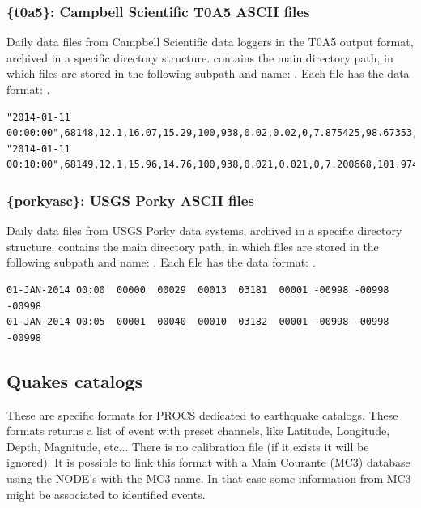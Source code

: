 \subsubsection{\{t0a5\}: Campbell Scientific T0A5 ASCII files}

Daily data files from Campbell Scientific data loggers in the T0A5 output format, archived in a specific directory structure.  contains the main directory path, in which files are stored in the following subpath and name: . Each file has the data format: .

\begin{lstlisting}[language={},title=Campbell T0A5 format example]
"2014-01-11 00:00:00",68148,12.1,16.07,15.29,100,938,0.02,0.02,0,7.875425,98.67353,10.86884,0,0,0,0,0,0,0,0
"2014-01-11 00:10:00",68149,12.1,15.96,14.76,100,938,0.021,0.021,0,7.200668,101.9742,11.35311,0,0,0,0,0,0,0,0
\end{lstlisting}


\subsubsection{\{porkyasc\}: USGS Porky ASCII files}

Daily data files from USGS Porky data systems, archived in a specific directory structure.  contains the main directory path, in which files are stored in the following subpath and name: . Each file has the data format: .

\begin{lstlisting}[language={},title=USGS Porky format example]
01-JAN-2014 00:00  00000  00029  00013  03181  00001 -00998 -00998 -00998
01-JAN-2014 00:05  00001  00040  00010  03182  00001 -00998 -00998 -00998
\end{lstlisting}

\subsection{Quakes catalogs}

These are specific formats for PROCS dedicated to earthquake catalogs. These formats returns a list of event with preset channels, like Latitude, Longitude, Depth, Magnitude, etc... There is no calibration file (if it exists it will be ignored). It is possible to link this format with a Main Courante (MC3) database using the NODE's  with the MC3 name. In that case some information from MC3 might be associated to identified events.


